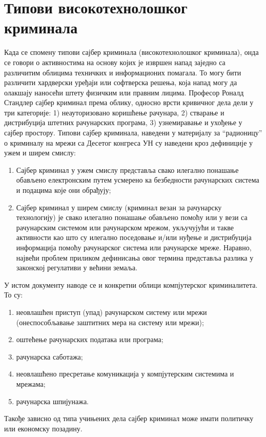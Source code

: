 \documentclass[a4paper]{article}
\begin{document}
	\section{Типови високотехнолошког криминала}
	\label{sec:TipoviVisKri}
	Када се спомену типови сајбер криминала (високотехнолошког
	криминала), онда се говори о активностима на основу којих је извршен напад заједно са различитим облицима техничких и информационих помагала. То могу бити различити хардверски уређаји или софтверска решења, која напад могу да олакшају наносећи штету физичким или правним лицима. \newline
	Професор Роналд Стандлер сајбер криминал према облику, односно врсти кривичног дела дели у три категорије: 1) неауторизовано коришћење рачунара, 2) стварање и дистрибуција штетних рачунарских програма, 3) узнемиравање и ухођење у сајбер простору. \newline
	Типови сајбер криминала, наведени у материјалу за “радионицу” о криминалу на мрежи са Десетог конгреса УН су наведени кроз дефиниције у ужем и ширем смислу:
	\begin{enumerate}
		\item Сајбер криминал у ужем смислу представља свако илегално понашање обављено електронским путем усмерено ка безбедности рачунарских система и подацима које они обрађују;
		\item Сајбер криминал у ширем смислу (криминал везан за рачунарску технологију) је свако илегално понашање обављено помоћу или у вези са рачунарским системом или рачунарском мрежом, укључујући и такве активности као што су илегално поседовање и/или нуђење и дистрибуција информација помоћу рачунарског система или рачунарске мреже. Наравно, највећи проблем приликом дефинисања овог термина представља разлика у законској регулативи у већини земаља.
	\end{enumerate}
	
	У истом документу наводе се и конкретни облици компјутерског криминалитета. То су:
	\begin{enumerate}
		\item неовлашћен приступ (упад) рачунарском систему или мрежи (онеспособљавање заштитних мера на систему или мрежи);
		\item оштећење рачунарских података или програма;
		\item рачунарска саботажа;
		\item неовлашћено пресретање комуникација у компјутерским системима и мрежама;
		\item рачунарска шпијунажа.
	\end{enumerate}
	Такође зависно од типа учињених дела сајбер криминал може имати политичку или економску позадину. \newline
	
\end{document}
